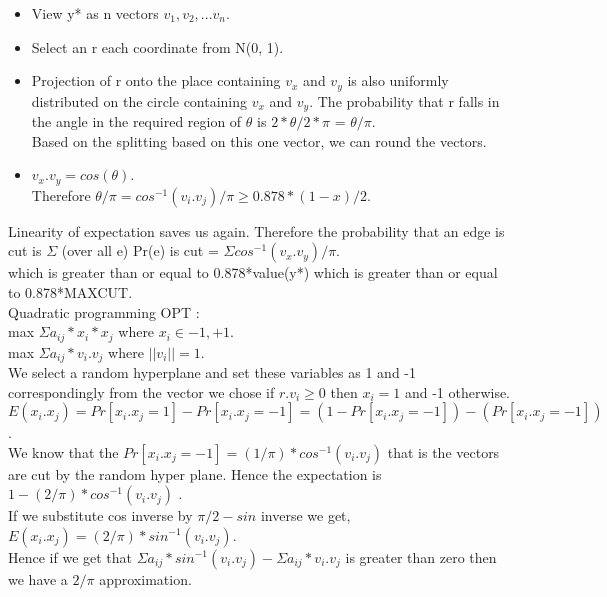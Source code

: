 \documentclass[solution,addpoints,12pt]{exam}
\begin{document}
\begin{itemize}
\item View y* as n vectors $v_1, v_2, ... v_n$.
\item Select an r each coordinate from N(0, 1).
\item Projection of r onto the place containing $v_x$ and $v_y$
is also uniformly distributed on the circle containing $v_x$ and $v_y$.
The probability that r falls in the angle in the required region
of $\theta$ is $2*\theta/2*\pi$ = $\theta/\pi$.\\
Based on the splitting based on this one vector, we can round the
vectors.\\
\item $v_x.v_y = cos(\theta)$.\\
Therefore $\theta/\pi = {cos}^{-1}(v_i.v_j)/\pi \ge 0.878*(1-x)/2$.
\end{itemize}
Linearity of expectation saves us again. Therefore the probability
that an edge is cut is $\Sigma$ (over all e) Pr(e) is cut = $\Sigma {cos}^{-1}(v_x.v_y)/\pi$.\\
which is greater than or equal to 0.878*value(y*) which is greater than or equal to
0.878*MAXCUT.\\

Quadratic programming OPT :\\
max $\Sigma a_{ij}*x_i*x_j$ where $x_i \in {-1, +1}$.\\
max $\Sigma a_{ij}*v_i.v_j$ where $||v_i|| = 1$.\\
We select a random hyperplane and set these variables as 1 and -1
correspondingly from the vector we chose if $r.v_i \ge 0$ then $x_i = 1$ and
-1 otherwise.\\

$E(x_i.x_j) = Pr[x_i.x_j = 1] - Pr[x_i.x_j = -1] = (1 - Pr[x_i.x_j = -1]) - (Pr[x_i.x_j = -1])$.\\
We know that the $Pr[x_i.x_j = - 1] = (1/\pi)*{cos}^{-1}(v_i.v_j)$ that is the
vectors are cut by the random hyper plane. Hence the expectation is $1 - (2/\pi)*{cos}^{-1}(v_i.v_j)$
.\\
If we substitute cos inverse by $\pi/2 - sin$ inverse we get,\\
$E(x_i.x_j) = (2/\pi)*{sin}^{-1}(v_i.v_j)$.\\
Hence if we get that $\Sigma a_{ij}*{sin}^{-1}(v_i.v_j) - \Sigma a_{ij}*v_i.v_j$
is greater than zero then we have a $2/\pi$ approximation.\\
\end{document}
